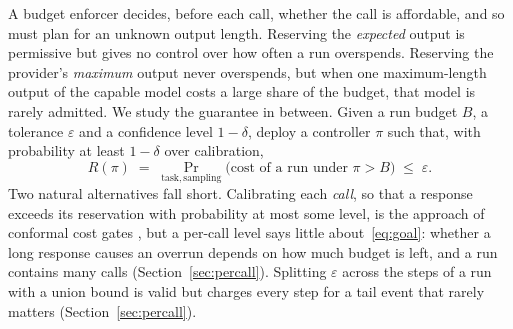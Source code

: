 \documentclass[11pt]{article}
\theoremstyle{remark}
\begin{document}
A budget enforcer decides, before each call, whether the call is affordable,
and so must plan for an unknown output length. Reserving the \emph{expected}
output is permissive but gives no control over how often a run overspends.
Reserving the provider's \emph{maximum} output never overspends, but when one
maximum-length output of the capable model costs a large share of the budget,
that model is rarely admitted. We study the guarantee in between. Given a run
budget $B$, a tolerance $\varepsilon$ and a confidence level $1-\delta$, deploy
a controller $\pi$ such that, with probability at least $1-\delta$ over
calibration,
\begin{equation}\label{eq:goal}
  R(\pi) \;=\; \Pr_{\text{task},\,\text{sampling}}\bigl(\text{cost of a run under } \pi > B\bigr) \;\le\; \varepsilon .
\end{equation}
Two natural alternatives fall short. Calibrating each \emph{call}, so that a
response exceeds its reservation with probability at most some level, is the
approach of conformal cost gates \citep{valkanas2025c3po,besanson2026greensarc},
but a per-call level says little about~\eqref{eq:goal}: whether a long response
causes an overrun depends on how much budget is left, and a run contains many
calls (Section~\ref{sec:percall}). Splitting $\varepsilon$ across the steps of a
run with a union bound is valid but charges every step for a tail event that
rarely matters (Section~\ref{sec:percall}).
\end{document}
